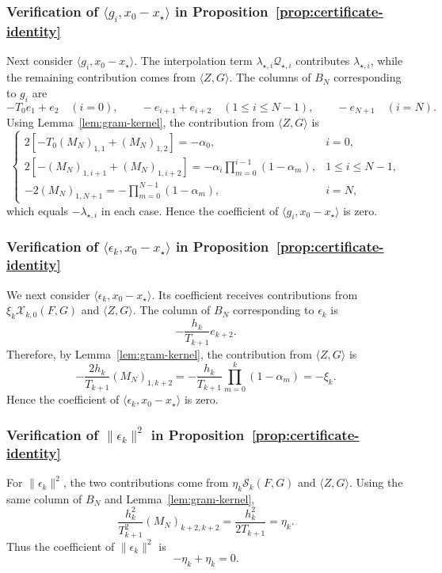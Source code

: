 \subsubsection{Verification of $\langle g_i,x_0-x_\star\rangle$ in Proposition~\ref{prop:certificate-identity}}
Next consider $\langle g_i,x_0-x_\star\rangle$. The interpolation term $\lambda_{\star,i}\mathcal Q_{\star,i}$ contributes $\lambda_{\star,i}$, while the remaining contribution comes from $\langle Z,G\rangle$. The columns of $B_N$ corresponding to $g_i$ are
\[-T_0e_1+e_2\quad(i=0),\qquad -e_{i+1}+e_{i+2}\quad(1\le i\le N-1),\qquad
-e_{N+1}\quad(i=N). \]
Using Lemma~\ref{lem:gram-kernel}, the contribution from $\langle Z,G\rangle$ is \[ \begin{cases}
2\left[-T_0(M_N)_{1,1}+(M_N)_{1,2}\right]=-\alpha_0,&i=0,\\
2\left[-(M_N)_{1,i+1}+(M_N)_{1,i+2}\right]
=-\alpha_i\displaystyle\prod_{m=0}^{i-1}(1-\alpha_m),&1\le i\le N-1,\\
-2(M_N)_{1,N+1}
=-\displaystyle\prod_{m=0}^{N-1}(1-\alpha_m),&i=N,
\end{cases} \]
which equals $-\lambda_{\star,i}$ in each case. Hence the coefficient of $\langle g_i,x_0-x_\star\rangle$ is zero.
\subsubsection{Verification of $\langle\epsilon_k,x_0-x_\star\rangle$ in Proposition~\ref{prop:certificate-identity}}
We next consider $\langle\epsilon_k,x_0-x_\star\rangle$. Its coefficient receives contributions from $\xi_k\mathcal X_{k,0}(F,G)$ and $\langle Z,G\rangle$. The column of $B_N$ corresponding to $\epsilon_k$ is
\[ -\frac{h_k}{T_{k+1}}e_{k+2}. \]
Therefore, by Lemma~\ref{lem:gram-kernel}, the contribution from $\langle Z,G\rangle$ is
\[-\frac{2h_k}{T_{k+1}}(M_N)_{1,k+2} =-\frac{h_k}{T_{k+1}}\prod_{m=0}^{k}(1-\alpha_m) =-\xi_k.\]
Hence the coefficient of $\langle\epsilon_k,x_0-x_\star\rangle$ is zero.
\subsubsection{Verification of $\|\epsilon_k\|^2$ in Proposition~\ref{prop:certificate-identity}}
For $\|\epsilon_k\|^2$, the two contributions come from $\eta_k\mathcal S_k(F,G)$ and $\langle Z,G\rangle$. Using the same column of $B_N$ and Lemma~\ref{lem:gram-kernel},
\[ \frac{h_k^2}{T_{k+1}^2}(M_N)_{k+2,k+2} =\frac{h_k^2}{2T_{k+1}}
=\eta_k. \]
Thus the coefficient of $\|\epsilon_k\|^2$ is
\[ -\eta_k+\eta_k=0. \]

